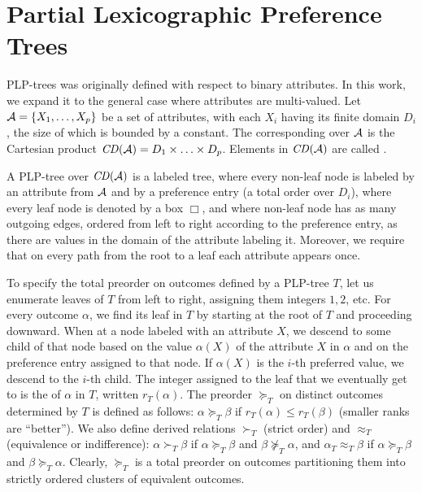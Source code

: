 \section{Partial Lexicographic Preference Trees}
PLP-trees was originally defined with respect to 
binary attributes\cite{conf/aaai15/LiuT}.
In this work, we expand it to the general case
where attributes are multi-valued.
Let $\mathcal{A}=\{X_1,\ldots,X_p\}$ be a set of attributes, with each
$X_i$ having its finite domain $D_i$, the size of which is
bounded by a constant.
The corresponding  over $\mathcal{A}$ is the Cartesian product 
$\mathit{CD}(\mathcal{A})=D_1 \times \ldots \times D_p$.
Elements in $\mathit{CD}(\mathcal{A})$ are called .

A PLP-tree over $\mathit{CD}(\mathcal{A})$ is a labeled tree, where every
non-leaf node is labeled by an attribute from $\mathcal{A}$ and by a preference
entry (a total order over $D_i$), where every leaf node is denoted by a box 
$\Box$, and where non-leaf node has as many outgoing edges,
ordered from left to right according to the preference entry, as there are
values in the domain of the attribute labeling it. 
Moreover, we require that on every path from the root to a leaf
each attribute appears  once. 

To specify the total preorder on outcomes defined by a PLP-tree $T$, let 
us enumerate leaves of $T$ from left to right, assigning them 
integers $1,2$, etc. For every outcome $\alpha$, we find its leaf 
in $T$ by starting at the root of $T$ and proceeding downward. 
When at a node labeled with an attribute $X$, we descend to
some child of that node based on the value $\alpha(X)$ of the attribute $X$ 
in $\alpha$ and on the preference entry assigned to that node. 
If $\alpha(X)$ is the $i$-th preferred value, we descend to the $i$-th child. 
The integer assigned to the leaf that we eventually get 
to is the  
of $\alpha$ in $T$, written $r_T(\alpha)$. The preorder $\succeq_T$ on 
distinct outcomes determined by $T$ is defined as follows: $\alpha\succeq_T \beta$ 
if $r_T(\alpha)\leq r_T(\beta)$ (smaller ranks are ``better''). We also 
define derived relations $\succ_T$ (strict order) and $\approx_T$ 
(equivalence or indifference): $\alpha \succ_T\beta$ if $\alpha\succeq_T
\beta$ and $\beta \not\succeq_T \alpha$, and $\alpha_T\approx_T\beta$ if 
$\alpha\succeq_T\beta$ and $\beta\succeq_T \alpha$. Clearly, $\succeq_T$ 
is a total preorder on outcomes partitioning them into strictly ordered 
clusters of equivalent outcomes. 

